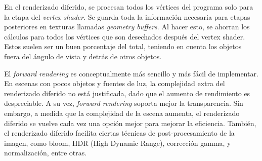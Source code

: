 En el renderizado diferido, se procesan todos los vértices del programa solo para la etapa del \textit{vertex shader}.
Se guarda toda la información necesaria para etapas posteriores en texturas llamadas \textit{geometry buffers}.
Al hacer esto, se ahorran los cálculos para todos los vértices que son desechados después del vertex shader. %
Estos suelen ser un buen porcentaje del total, teniendo en cuenta los objetos fuera del ángulo de vista y detrás de otros objetos.

El \textit{forward rendering} es conceptualmente más sencillo y más fácil de implementar.
En escenas con pocos objetos y fuentes de luz, la complejidad extra del renderizado diferido no está justificada, dado que el aumento de rendimiento es despreciable.
A su vez, \textit{forward rendering} soporta mejor la transparencia.
Sin embargo, a medida que la complejidad de la escena aumenta, el renderizado diferido se vuelve cada vez una opción mejor para mejorar la eficiencia.
También, el renderizado diferido facilita ciertas técnicas de post-procesamiento de la imagen, como bloom, HDR (High Dynamic Range), corrección gamma, y normalización, entre otras.







